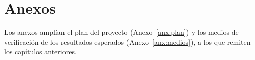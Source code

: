 \documentclass[12pt,a4paper]{report}
\newcommand{\capsep}{.}
\newcommand{\tocchapname}{Capítulo}
\newcommand{\tocchapsep}{.}
\begin{document}
\begingroup
{}
\setlength{\parskip}{0pt}
\tableofcontents
\listoffigures
\listoftables
\endgroup

%
% 
\clearpage
{}









{\raggedright %
\printbibliography[heading=bibintoc, title={Referencias}]}

\appendix
\renewcommand{\capsep}{:}
\addtocontents{toc}{\protect\renewcommand{\protect\tocchapname}{Anexo}%
    \protect\renewcommand{\protect\tocchapsep}{:}}
\chapter*{Anexos}
Los anexos amplían el plan del proyecto (Anexo~\ref{anx:plan}) y los medios de
verificación de los resultados esperados (Anexo~\ref{anx:medios}), a los que
remiten los capítulos anteriores.


\end{document}
